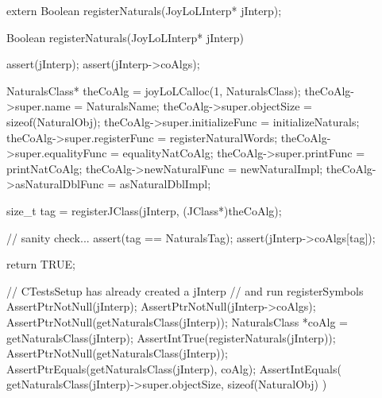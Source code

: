 \startCHeader
extern Boolean registerNaturals(JoyLoLInterp* jInterp);
\stopCHeader
{}

\startCCode
Boolean registerNaturals(JoyLoLInterp* jInterp) {
  assert(jInterp);
  assert(jInterp->coAlgs);
  
  NaturalsClass* theCoAlg        = joyLoLCalloc(1, NaturalsClass);
  theCoAlg->super.name           = NaturalsName;
  theCoAlg->super.objectSize     = sizeof(NaturalObj);
  theCoAlg->super.initializeFunc = initializeNaturals;
  theCoAlg->super.registerFunc   = registerNaturalWords;
  theCoAlg->super.equalityFunc   = equalityNatCoAlg;
  theCoAlg->super.printFunc      = printNatCoAlg;
  theCoAlg->newNaturalFunc       = newNaturalImpl;
  theCoAlg->asNaturalDblFunc     = asNaturalDblImpl;

  size_t tag =
    registerJClass(jInterp, (JClass*)theCoAlg);
  
  // sanity check...
  assert(tag == NaturalsTag);
  assert(jInterp->coAlgs[tag]);

  return TRUE;
}
\stopCCode


\startCTest
  // CTestsSetup has already created a jInterp
  // and run registerSymbols
  AssertPtrNotNull(jInterp);
  AssertPtrNotNull(jInterp->coAlgs);
  AssertPtrNotNull(getNaturalsClass(jInterp));
  NaturalsClass *coAlg = getNaturalsClass(jInterp);
  AssertIntTrue(registerNaturals(jInterp));
  AssertPtrNotNull(getNaturalsClass(jInterp));
  AssertPtrEquals(getNaturalsClass(jInterp), coAlg);
  AssertIntEquals(
    getNaturalsClass(jInterp)->super.objectSize,
    sizeof(NaturalObj)
  )
\stopCTest
\stopTestCase
\stopTestSuite
